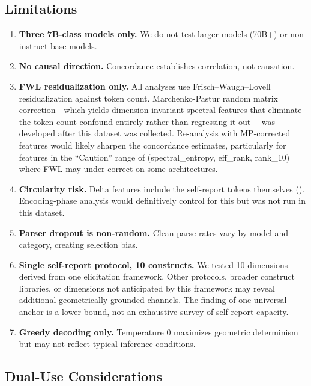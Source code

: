 \documentclass[11pt,a4paper]{article}
\begin{document}
\subsection{Limitations}

\begin{enumerate}[nosep]
    \item \textbf{Three 7B-class models only.} We do not test larger models (70B+) or non-instruct base models.

    \item \textbf{No causal direction.} Concordance establishes correlation, not causation.

    \item \textbf{FWL residualization only.} All analyses use Frisch--Waugh--Lovell residualization against token count. Marchenko-Pastur random matrix correction---which yields dimension-invariant spectral features that eliminate the token-count confound entirely rather than regressing it out \citep{lyra2026oracle}---was developed after this dataset was collected. Re-analysis with MP-corrected features would likely sharpen the concordance estimates, particularly for features in the ``Caution'' range of  (spectral\_entropy, eff\_rank, rank\_10) where FWL may under-correct on some architectures.

    \item \textbf{Circularity risk.} Delta features include the self-report tokens themselves (). Encoding-phase analysis would definitively control for this but was not run in this dataset.

    \item \textbf{Parser dropout is non-random.} Clean parse rates vary by model and category, creating selection bias.

    \item \textbf{Single self-report protocol, 10 constructs.} We tested 10 dimensions derived from one elicitation framework. Other protocols, broader construct libraries, or dimensions not anticipated by this framework may reveal additional geometrically grounded channels. The finding of one universal anchor is a lower bound, not an exhaustive survey of self-report capacity.

    \item \textbf{Greedy decoding only.} Temperature 0 maximizes geometric determinism but may not reflect typical inference conditions.
\end{enumerate}

\subsection{Dual-Use Considerations}
\end{document}
